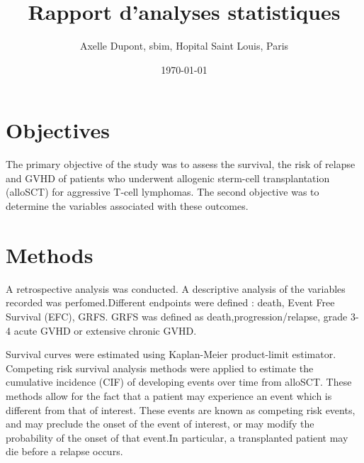 \documentclass[a4paper,11pt] {article}
\begin{document}
\title{Rapport  d'analyses statistiques}
\author{Axelle Dupont, sbim, Hopital Saint Louis, Paris}
\date\today















\maketitle

\tableofcontents
\pagebreak[4]
\listoftables
\listoffigures


\pagebreak[4]

\section{Objectives}

The primary objective of the study was to assess the survival, the risk of relapse and GVHD  of patients who underwent allogenic sterm-cell transplantation (alloSCT) for aggressive T-cell lymphomas. 
The second objective was to determine the variables associated with these outcomes.

\section{Methods}

A retrospective analysis was conducted. A descriptive analysis of the variables recorded was perfomed.Different endpoints were defined : death, Event Free Survival (EFC), GRFS. GRFS was defined as death,progression/relapse,  grade 3-4 acute GVHD or extensive chronic GVHD.

Survival curves were estimated using Kaplan-Meier product-limit estimator.
Competing risk survival analysis methods were applied to estimate the cumulative incidence (CIF) of developing events over time from alloSCT. These methods allow for the fact that a patient may experience an event which is different from that of interest. These events are known as competing risk events, and may preclude the onset of the event of interest, or may modify the probability of the onset of that event.In particular, a transplanted patient may die before a relapse occurs. 
\end{document}
